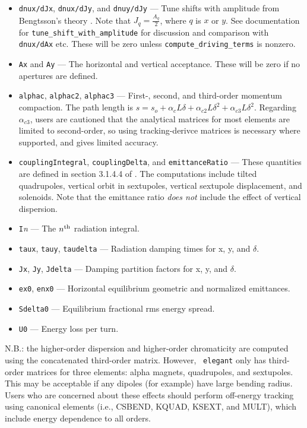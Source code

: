 \documentclass[11pt]{article}
\begin{document}
\begin{itemize}
 zero unless \verb|compute_driving_terms| is nonzero.  See table \ref{tab:drivingTerms} for an explanation of each term.
\item {\tt dnux/dJx}, {\tt dnux/dJy},  and {\tt dnuy/dJy} --- Tune shifts with amplitude from Bengtsson's theory \cite{Bengtsson}.
  Note that $J_q = \frac{A_q}{2}$, where $q$ is $x$ or $y$.
 See documentation for \verb|tune_shift_with_amplitude| for discussion and comparison with {\tt dnux/dAx} etc.
 These will be zero unless \verb|compute_driving_terms| is nonzero.
\item {\tt Ax} and {\tt Ay} --- The horizontal and vertical acceptance.  These will be zero if no apertures are
  defined.
\item {\tt alphac}, {\tt alphac2}, {\tt alphac3} --- First-, second, and third-order momentum compaction.  The path length is 
  $s = s_o + \alpha_c L \delta + \alpha_{c2} L \delta^2 + \alpha_{c3} L \delta^2$.  Regarding $\alpha_{c3}$, users are cautioned that
  the analytical matrices for most elements are limited to second-order, so using tracking-derivce matrices is necessary
  where supported, and gives limited accuracy.
\item {\tt couplingIntegral}, {\tt couplingDelta}, and {\tt emittanceRatio} --- These quantities are defined
  in section 3.1.4.4 of \cite{HAPE}.  The computations include tilted quadrupoles, vertical orbit in sextupoles,
  vertical sextupole displacement, and solenoids.  Note that the emittance ratio {\em does not} include 
  the effect of vertical dispersion.
\item {\tt I}{\em n} --- The $n^{\rm th}$ radiation integral.
\item {\tt taux}, {\tt tauy}, {\tt taudelta} --- Radiation damping times for x, y, and $\delta$.
\item {\tt Jx}, {\tt Jy}, {\tt Jdelta} --- Damping partition factors for  x, y, and $\delta$.
\item {\tt ex0}, {\tt enx0} --- Horizontal equilibrium geometric and normalized emittances.
\item {\tt Sdelta0} --- Equilibrium fractional rms energy spread.
\item {\tt U0} --- Energy loss per turn.
\end{itemize}

N.B.: the higher-order dispersion and higher-order chromaticity are
computed using the concatenated third-order matrix.  However, {\tt
elegant} only has third-order matrices for three elements:
alpha magnets, quadrupoles, and sextupoles.  This may be acceptable if
any dipoles (for example) have large bending radius.  Users who are
concerned about these effects should perform off-energy tracking using
canonical elements (i.e., CSBEND, KQUAD, KSEXT, and MULT), which
include energy dependence to all orders.
\end{document}
